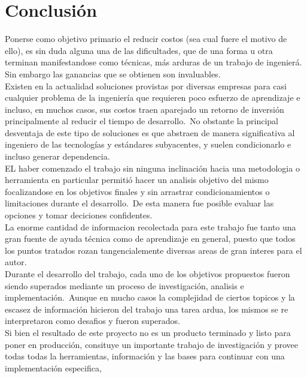 \chapter{Conclusi\'on}

Ponerse como objetivo primario el reducir costos (sea cual fuere el motivo de
ello), es sin duda alguna una de las dificultades, que de una forma u otra
terminan manifestandose como t\'ecnicas, m\'as arduras de un trabajo de
ingenier\'a. Sin embargo las ganancias que se obtienen son invaluables.\\

Existen en la actualidad soluciones provistas por diversas empresas para casi
cualquier problema de la ingenier\'ia que requieren poco esfuerzo de
aprendizaje e incluso, en muchos casos, sus costos traen aparejado un retorno
de inversi\'on principalmente al reducir el tiempo de desarrollo.\
No obstante la principal desventaja de este tipo de soluciones es que abstraen
de manera significativa al ingeniero de las tecnolog\'ias y est\'andares
subyacentes, y suelen condicionarlo e incluso generar dependencia.\\

EL haber comenzado el trabajo sin ninguna inclinaci\'on hacia una metodologia
o herramienta en particular permiti\'o hacer un analisis objetivo del mismo
focalizandose en los objetivos finales y sin arrastrar condicionamientos
o limitaciones durante el desarrollo.\ 
De esta manera fue posible evaluar las opciones y tomar deciciones
confidentes.\\

La enorme cantidad de informacion recolectada para este trabajo fue tanto una
gran fuente de ayuda t\'ecnica como de aprendizaje en general, puesto que
todos los puntos tratados rozan tangencialemente diversas areas de gran
interes para el autor.\\

Durante el desarrollo del trabajo, cada uno de los objetivos propuestos fueron
siendo superados mediante un proceso de investigaci\'on, analisis e
implementaci\'on.\
Aunque en mucho casos la complejidad de ciertos topicos y la escasez de
informaci\'on hicieron del trabajo una tarea ardua, los mismos se re
interpretaron como desafios y fueron superados.\\

Si bien el resultado de este proyecto no es un producto terminado y listo para
poner en producci\'on, consituye un importante trabajo de investigaci\'on y
provee todas todas la herramientas, informaci\'on y las bases para continuar
con una implementaci\'on especifica, %


